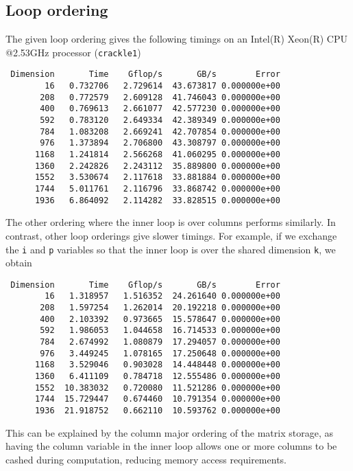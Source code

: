 \documentclass{article}
\begin{document}
\subsection{Loop ordering}
The given loop ordering gives the following timings on an Intel(R) Xeon(R) CPU
@2.53GHz processor (\texttt{crackle1})
\begin{verbatim}
 Dimension       Time    Gflop/s       GB/s        Error
        16   0.732706   2.729614  43.673817 0.000000e+00
       208   0.772579   2.609128  41.746043 0.000000e+00
       400   0.769613   2.661077  42.577230 0.000000e+00
       592   0.783120   2.649334  42.389349 0.000000e+00
       784   1.083208   2.669241  42.707854 0.000000e+00
       976   1.373894   2.706800  43.308797 0.000000e+00
      1168   1.241814   2.566268  41.060295 0.000000e+00
      1360   2.242826   2.243112  35.889800 0.000000e+00
      1552   3.530674   2.117618  33.881884 0.000000e+00
      1744   5.011761   2.116796  33.868742 0.000000e+00
      1936   6.864092   2.114282  33.828515 0.000000e+00
\end{verbatim}
The other ordering where the inner loop is over columns performs similarly. In
contrast, other loop orderings give slower timings. For example, if we exchange
the \texttt{i} and \texttt{p} variables so that the inner loop is over the
shared dimension \texttt{k}, we obtain
\begin{verbatim}
 Dimension       Time    Gflop/s       GB/s        Error
        16   1.318957   1.516352  24.261640 0.000000e+00
       208   1.597254   1.262014  20.192218 0.000000e+00
       400   2.103392   0.973665  15.578647 0.000000e+00
       592   1.986053   1.044658  16.714533 0.000000e+00
       784   2.674992   1.080879  17.294057 0.000000e+00
       976   3.449245   1.078165  17.250648 0.000000e+00
      1168   3.529046   0.903028  14.448448 0.000000e+00
      1360   6.411109   0.784718  12.555486 0.000000e+00
      1552  10.383032   0.720080  11.521286 0.000000e+00
      1744  15.729447   0.674460  10.791354 0.000000e+00
      1936  21.918752   0.662110  10.593762 0.000000e+00
\end{verbatim}
This can be explained by the column major ordering of the matrix storage, as
having the column variable in the inner loop allows one or more columns to be
cashed during computation, reducing memory access requirements.
\end{document}
